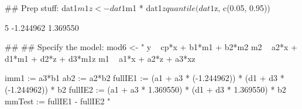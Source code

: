 \begin{Schunk}
\begin{Sinput}
 ## Prep stuff:
 dat1$m1z <- dat1$m1 * dat1$z
 quantile(dat1$z, c(0.05, 0.95))
\end{Sinput}
\begin{Soutput}
       5%       95% 
-1.244962  1.369550 
\end{Soutput}
\begin{Sinput}
 ##
 ## Specify the model:
 mod6 <- "
 y ~ cp*x + b1*m1 + b2*m2
 m2 ~ a2*x + d1*m1 + d2*z + d3*m1z
 m1 ~ a1*x + a2*z + a3*xz
 
 imm1 := a3*b1
 ab2 := a2*b2
 fullIE1 := (a1 + a3 * (-1.244962)) * 
            (d1 + d3 * (-1.244962)) * b2
 fullIE2 := (a1 + a3 * 1.369550) * 
            (d1 + d3 * 1.369550) * b2
 mmTest := fullIE1 - fullIE2
 "
\end{Sinput}
\end{Schunk}

